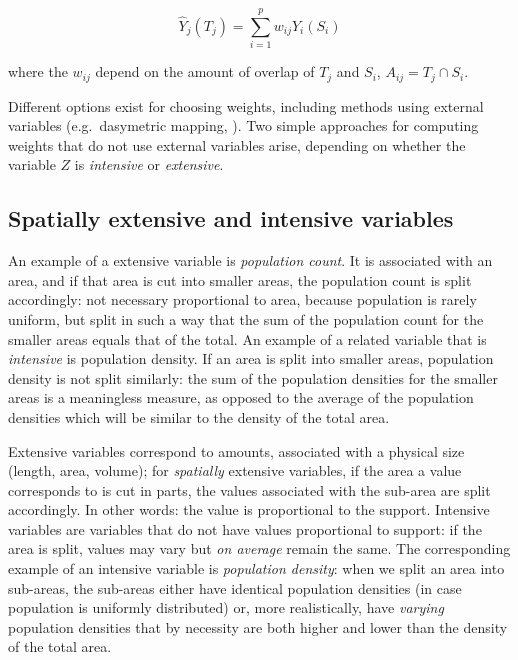 \documentclass[]{book}
\begin{document}
\begin{equation}
\hat{Y}_j(T_j) = \sum_{i=1}^p w_{ij} Y_i(S_i)
\label{eq:aw}
\end{equation}

where the \(w_{ij}\) depend on the amount of overlap of \(T_j\) and
\(S_i\), \(A_{ij} = T_j \cap S_i\).

Different options exist for choosing weights, including methods
using external variables (e.g.~dasymetric mapping, \citet{mennis}).
Two simple approaches for computing weights that do not use external
variables arise, depending on whether the variable \(Z\) is \emph{intensive}
or \emph{extensive}.

\hypertarget{extensiveintensive}{%
\subsection{Spatially extensive and intensive variables}\label{extensiveintensive}}

An example of a extensive variable is \emph{population count}. It
is associated with an area, and if that area is cut into smaller
areas, the population count is split accordingly: not necessary
proportional to area, because population is rarely uniform, but split
in such a way that the sum of the population count for the smaller
areas equals that of the total. An example of a related variable
that is \emph{intensive} is population density. If an area is split
into smaller areas, population density is not split similarly:
the sum of the population densities for the smaller areas is a
meaningless measure, as opposed to the average of the population
densities which will be similar to the density of the total area.

Extensive variables correspond to amounts, associated with a physical
size (length, area, volume); for \emph{spatially} extensive variables,
if the area a value corresponds to is cut in parts, the values
associated with the sub-area are split accordingly. In other words:
the value is proportional to the support. Intensive variables are
variables that do not have values proportional to support: if the
area is split, values may vary but \emph{on average} remain the same.
The corresponding example of an intensive variable is \emph{population
density}: when we split an area into sub-areas, the sub-areas either
have identical population densities (in case population is uniformly
distributed) or, more realistically, have \emph{varying} population
densities that by necessity are both higher and lower than the
density of the total area.
\end{document}
